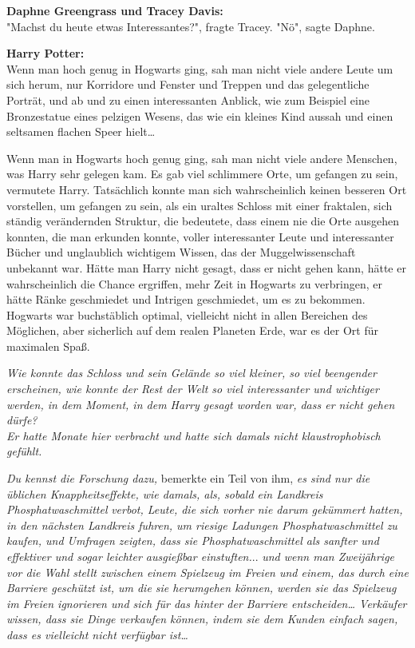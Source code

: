 {\textbf{Daphne Greengrass und Tracey Davis:}\\ "Machst du heute etwas Interessantes?", fragte Tracey. "Nö", sagte Daphne.

\textbf{Harry Potter:}\\ Wenn man hoch genug in Hogwarts ging, sah man nicht viele andere Leute um sich herum, nur Korridore und Fenster und Treppen und das gelegentliche Porträt, und ab und zu einen interessanten Anblick, wie zum Beispiel eine Bronzestatue eines pelzigen Wesens, das wie ein kleines Kind aussah und einen seltsamen flachen Speer hielt…

Wenn man in Hogwarts hoch genug ging, sah man nicht viele andere Menschen, was Harry sehr gelegen kam. Es gab viel schlimmere Orte, um gefangen zu sein, vermutete Harry. Tatsächlich konnte man sich wahrscheinlich keinen besseren Ort vorstellen, um gefangen zu sein, als ein uraltes Schloss mit einer fraktalen, sich ständig verändernden Struktur, die bedeutete, dass einem nie die Orte ausgehen konnten, die man erkunden konnte, voller interessanter Leute und interessanter Bücher und unglaublich wichtigem Wissen, das der Muggelwissenschaft unbekannt war. Hätte man Harry nicht gesagt, dass er nicht gehen kann, hätte er wahrscheinlich die Chance ergriffen, mehr Zeit in Hogwarts zu verbringen, er hätte Ränke geschmiedet und Intrigen geschmiedet, um es zu bekommen. Hogwarts war buchstäblich optimal, vielleicht nicht in allen Bereichen des Möglichen, aber sicherlich auf dem realen Planeten Erde, war es der Ort für maximalen Spaß.

\emph{Wie konnte das Schloss und sein Gelände so viel kleiner, so viel beengender erscheinen, wie konnte der Rest der Welt so viel interessanter und wichtiger werden, in dem Moment, in dem Harry gesagt worden war, dass er nicht gehen dürfe?}\\ \emph{Er hatte Monate hier verbracht und hatte sich damals nicht klaustrophobisch gefühlt.}

\emph{Du kennst die Forschung dazu,} bemerkte ein Teil von ihm, \emph{es sind nur die üblichen Knappheitseffekte, wie damals, als, sobald ein Landkreis Phosphatwaschmittel} \emph{verbot, Leute, die sich vorher nie darum gekümmert hatten, in den nächsten Landkreis fuhren, um riesige Ladungen Phosphatwaschmittel zu kaufen, und Umfragen zeigten, dass sie Phosphatwaschmittel als sanfter und effektiver und sogar leichter ausgießbar einstuften.}.. \emph{und wenn man Zweijährige vor die Wahl stellt zwischen einem Spielzeug im Freien und einem, das durch eine Barriere geschützt ist, um die sie herumgehen können, werden sie das Spielzeug im Freien ignorieren und sich für das hinter der Barriere entscheiden… Verkäufer wissen, dass sie Dinge verkaufen können, indem sie dem Kunden einfach sagen, dass es vielleicht nicht verfügbar ist…}

}
